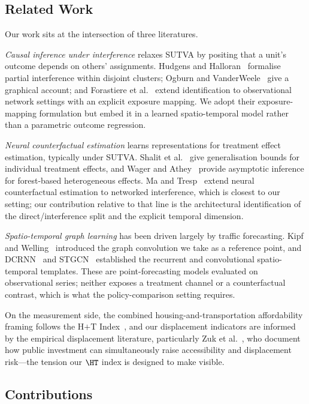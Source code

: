 \subsection{Related Work}

Our work sits at the intersection of three literatures.

\emph{Causal inference under interference} relaxes SUTVA by positing that a
unit's outcome depends on others' assignments. Hudgens and
Halloran~\cite{hudgens2008} formalise partial interference within disjoint
clusters; Ogburn and VanderWeele~\cite{ogburn2014} give a graphical account;
and Forastiere et al.~\cite{forastiere2021} extend identification to
observational network settings with an explicit exposure mapping. We adopt
their exposure-mapping formulation but embed it in a learned spatio-temporal
model rather than a parametric outcome regression.

\emph{Neural counterfactual estimation} learns representations for treatment
effect estimation, typically under SUTVA. Shalit et al.~\cite{shalit2017cfr}
give generalisation bounds for individual treatment effects, and Wager and
Athey~\cite{wager2018causalforest} provide asymptotic inference for forest-based
heterogeneous effects. Ma and Tresp~\cite{ma2021netdeconf} extend neural
counterfactual estimation to networked interference, which is closest to our
setting; our contribution relative to that line is the architectural
identification of the direct/interference split and the explicit temporal
dimension.

\emph{Spatio-temporal graph learning} has been driven largely by traffic
forecasting. Kipf and Welling~\cite{kipf2017gcn} introduced the graph
convolution we take as a reference point, and DCRNN~\cite{li2018dcrnn} and
STGCN~\cite{yu2018stgcn} established the recurrent and convolutional
spatio-temporal templates. These are point-forecasting models evaluated on
observational series; neither exposes a treatment channel or a counterfactual
contrast, which is what the policy-comparison setting requires.

On the measurement side, the combined housing-and-transportation affordability
framing follows the H$+$T Index~\cite{cnt2023ht}, and our displacement
indicators are informed by the empirical displacement literature, particularly
Zuk et al.~\cite{zuk2018gentrification}, who document how public investment can
simultaneously raise accessibility and displacement risk---the tension our
$\HT$ index is designed to make visible.

\subsection{Contributions}

